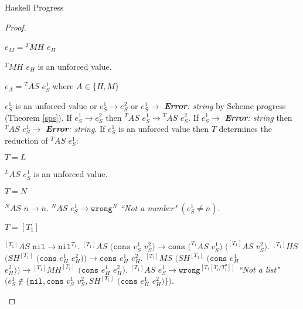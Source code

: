 \begin{theorem}{Haskell Progress}
\begin{proof}
\begin{case}{\pshm}
\begin{subcase}
\end{subcase}

\pssub
{\first{\varexpm}}
{\second{\varexpm}}
{\pshm}
{\exphm{\first{\vartyh}}{\first{\vartym}}{\second{\varexpm}}}
\pserr
{\first{\varexpm}}
{\pshm}

\end{case}


\begin{case}

$e_{M}={^{T}M}H$ $e_{H}$

$^{T}MH$ $e_{H}$ is an unforced value.

\end{case}


\begin{case}

$e_{A}={^{T}A}S$ $e_{S}^{1}$ where $A\in\lbrace H,M\rbrace$

$e_{S}^{1}$ is an unforced value or $e_{S}^{1}\rightarrow e_{S}^{2}$ or $e_{S}^{1}\rightarrow$ \emph{\textbf{Error}: string} by Scheme progress (Theorem \ref{sps}).  If $e_{S}^{1}\rightarrow e_{S}^{2}$ then $^{T}AS$ $e_{S}^{1}\rightarrow{^{T}A}S$ $e_{S}^{2}$.  If $e_{S}^{1}\rightarrow$ \emph{\textbf{Error}: string} then $^{T}AS$ $e_{S}^{1}\rightarrow$ \emph{\textbf{Error}: string}.  If $e_{S}^{1}$ is an unforced value then $T$ determines the reduction of $^{T}AS$ $e_{S}^{1}$:

\begin{subcase}

$T=L$

$^{L}AS$ $e_{S}^{1}$ is an unforced value.

\end{subcase}

\begin{subcase}

$T=N$

$^{N}AS$ $\overline{n}\rightarrow\overline{n}$.  $^{N}AS$ $e_{S}^{1}\rightarrow\mathtt{wrong}^{N}$ \emph{``Not a number"} $(e_{S}^{1}\neq\overline{n})$.

\end{subcase}

\begin{subcase}

$T=[T_{1}]$

$^{[T_{1}]}AS$ $\mathtt{nil}\rightarrow\mathtt{nil}^{T_{1}}$.  $^{[T_{1}]}AS$ $(\mathtt{cons}$ $v_{S}^{1}$ $v_{S}^{2})\rightarrow\mathtt{cons}$ $(^{T_{1}}AS$ $v_{S}^{1})$ $(^{[T_{1}]}AS$ $v_{S}^{2})$.  $^{[T_{1}]}HS$ $(SH^{[T_{1}]}$ $(\mathtt{cons}$ $e_{H}^{1}$ $e_{H}^{2}))\rightarrow\mathtt{cons}$ $e_{H}^{1}$ $e_{H}^{2}$.  $^{[T_{1}]}MS$ $(SH^{[T_{1}]}$ $(\mathtt{cons}$ $e_{H}^{1}$ $e_{H}^{2}))\rightarrow{^{[T_{1}]}M}H^{[T_{1}]}$ $(\mathtt{cons}$ $e_{H}^{1}$ $e_{H}^{2})$.  $^{[T_{1}]}AS$ $e_{S}^{1}\rightarrow\mathtt{wrong}^{[T_{1}[T_{i}/T_{i}^{a}]]}$ \emph{``Not a list"} $(e_{S}^{1}\not\in\lbrace\mathtt{nil},\mathtt{cons}$ $v_{S}^{1}$ $v_{S}^{2},SH^{[T_{1}]}$ $(\mathtt{cons}$ $e_{H}^{1}$ $e_{H}^{2})\rbrace)$.


\end{subcase}
\end{case}
\end{proof}
\end{theorem}
